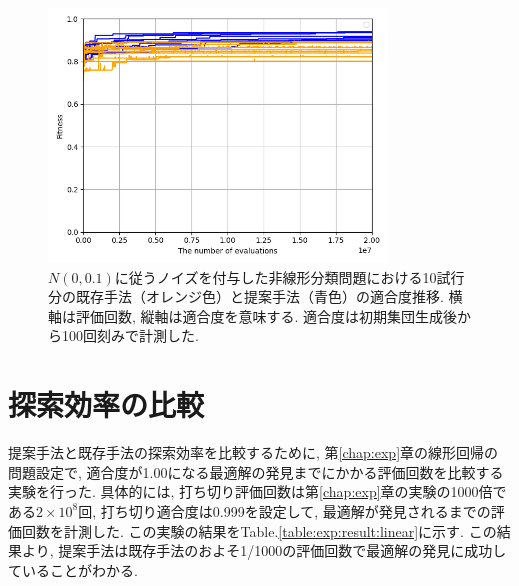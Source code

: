 \documentclass[11pt,oneside,openany,report]{jsbook}
\begin{document}
\begin{figure}[H]
  \centering
  \includegraphics[width=9cm]{exp/noisy_two_layers_nn_classification.png}
  \caption{$N(0,0.1)$に従うノイズを付与した非線形分類問題における10試行分の既存手法（オレンジ色）と提案手法（青色）の適合度推移. 横軸は評価回数, 縦軸は適合度を意味する. 適合度は初期集団生成後から100回刻みで計測した.}
  \label{fig:exp:result:noisy_two_layers_nn_classification}
\end{figure}


\section{探索効率の比較} \label{sec:consideration:efficiency}
提案手法と既存手法の探索効率を比較するために, 第\ref{chap:exp}章の線形回帰の問題設定で, 適合度が1.00になる最適解の発見までにかかる評価回数を比較する実験を行った. 具体的には, 打ち切り評価回数は第\ref{chap:exp}章の実験の1000倍である$2 \times 10^8$回, 打ち切り適合度は0.999を設定して, 最適解が発見されるまでの評価回数を計測した. この実験の結果をTable.\ref{table:exp:result:linear}に示す. この結果より, 提案手法は既存手法のおよそ1/1000の評価回数で最適解の発見に成功していることがわかる.
\end{document}
